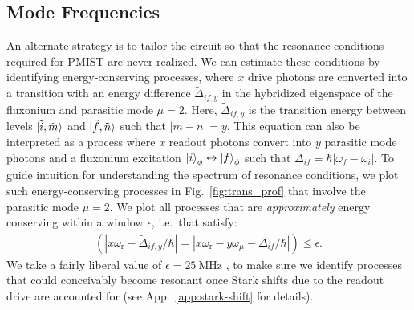 \documentclass[%
reprint,
superscriptaddress,
 amsmath,amssymb,
 aps,
 prx,
longbibliography,
floatfix,
]{revtex4-2}
\begin{document}
\subsection{Mode Frequencies}\label{mode-frequencies}

An alternate strategy is to tailor the circuit so that the resonance conditions required for PMIST are never realized. We can estimate these conditions by identifying energy-conserving processes, where $x$ drive photons are converted into a transition with an energy difference $\tilde{\Delta}_{if,y}$ in the hybridized eigenspace of the fluxonium and parasitic mode $\mu=2$. Here, $\tilde{\Delta}_{if,y}$ is the transition energy between levels $\ket{\tilde{i},\tilde{m}}$ and $\ket{\tilde{f},\tilde{n}}$ such that $|m-n|=y$. 
This equation can also be interpreted as a process where $x$ readout photons convert into $y$ parasitic mode photons and a fluxonium excitation $\ket{i}_\phi \leftrightarrow \ket{f}_\phi$ such that $\Delta_{if}=\hbar|\omega_f-\omega_i|$. To guide intuition for understanding the spectrum of resonance conditions, we plot such energy-conserving processes in Fig.~\ref{fig:trans_prof} that involve the parasitic mode $\mu=2$.
We plot all processes that are {\it approximately} energy conserving within a window $\epsilon$, i.e.~that satisfy:
\begin{align}
\left(
    |x\omega_\textrm{r}-\tilde{\Delta}_{if,y}/\hbar| = 
|x\omega_\textrm{r}-y\omega_\mu-\Delta_{if}/\hbar| \right) \le \epsilon.
\label{eq:En_cons}
\end{align}
We take a fairly liberal value of $\epsilon = 25 \ \textrm{MHz}$ , to make sure we identify processes that could conceivably become resonant once Stark shifts due to the readout drive are accounted for (see App.~\ref{app:stark-shift} for details).
\end{document}
